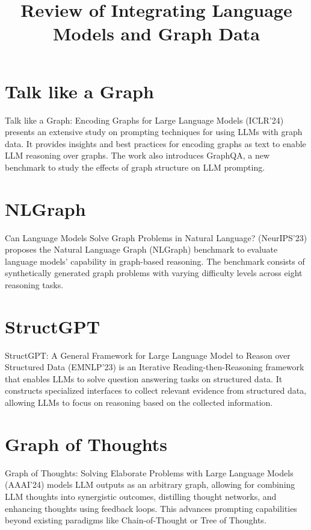\documentclass{sigkddExp}
\begin{document}
\title{Review of Integrating Language Models and Graph Data}
\maketitle

\section{Talk like a Graph}
\vspace{3mm}
Talk like a Graph: Encoding Graphs for Large Language Models (ICLR'24) presents an extensive study on prompting techniques for using LLMs with graph data. It provides insights and best practices for encoding graphs as text to enable LLM reasoning over graphs. The work also introduces GraphQA, a new benchmark to study the effects of graph structure on LLM prompting.

\section{NLGraph}
\vspace{3mm}
Can Language Models Solve Graph Problems in Natural Language? (NeurIPS'23) proposes the Natural Language Graph (NLGraph) benchmark to evaluate language models' capability in graph-based reasoning. The benchmark consists of synthetically generated graph problems with varying difficulty levels across eight reasoning tasks.

\section{StructGPT}
\vspace{3mm}
StructGPT: A General Framework for Large Language Model to Reason over Structured Data (EMNLP'23) is an Iterative Reading-then-Reasoning framework that enables LLMs to solve question answering tasks on structured data. It constructs specialized interfaces to collect relevant evidence from structured data, allowing LLMs to focus on reasoning based on the collected information.

\section{Graph of Thoughts}
\vspace{3mm}
Graph of Thoughts: Solving Elaborate Problems with Large Language Models (AAAI'24) models LLM outputs as an arbitrary graph, allowing for combining LLM thoughts into synergistic outcomes, distilling thought networks, and enhancing thoughts using feedback loops. This advances prompting capabilities beyond existing paradigms like Chain-of-Thought or Tree of Thoughts.
\end{document}
